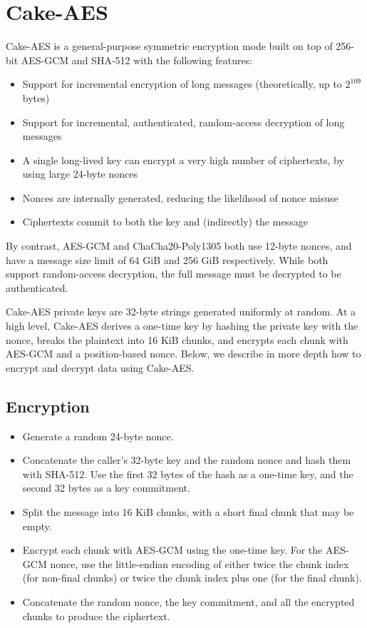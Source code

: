 \section{Cake-AES}\label{sec:cake}

Cake-AES is a general-purpose symmetric encryption mode built on top of 256-bit AES-GCM and SHA-512
with the following features:

\begin{itemize}
\item Support for incremental encryption of long messages (theoretically, up to $2^{109}$ bytes)
\item Support for incremental, authenticated, random-access decryption of long messages
\item A single long-lived key can encrypt a very high number of ciphertexts, by using large 24-byte
nonces
\item Nonces are internally generated, reducing the likelihood of nonce misuse
\item Ciphertexts commit to both the key and (indirectly) the message
\end{itemize}

By contrast, AES-GCM and ChaCha20-Poly1305 both use 12-byte nonces, and have a message size limit of
64 GiB and 256 GiB respectively. While both support random-access decryption, the full message must
be decrypted to be authenticated.

Cake-AES private keys are 32-byte strings generated uniformly at random. At a high level, Cake-AES
derives a one-time key by hashing the private key with the nonce, breaks the plaintext into 16 KiB
chunks, and encrypts each chunk with AES-GCM and a position-based nonce.  Below, we describe in more
depth how to encrypt and decrypt data using Cake-AES.

\subsection{Encryption}

\begin{itemize}
\item Generate a random 24-byte nonce.
\item Concatenate the caller's 32-byte key and the random nonce and hash them with SHA-512. Use the
first 32 bytes of the hash as a one-time key, and the second 32 bytes as a key commitment.
\item Split the message into 16 KiB chunks, with a short final chunk that may be empty.
\item Encrypt each chunk with AES-GCM using the one-time key. For the AES-GCM nonce, use the
little-endian encoding of either twice the chunk index (for non-final chunks) or twice the chunk
index plus one (for the final chunk).
\item Concatenate the random nonce, the key commitment, and all the encrypted chunks to produce the
ciphertext.
\end{itemize}

